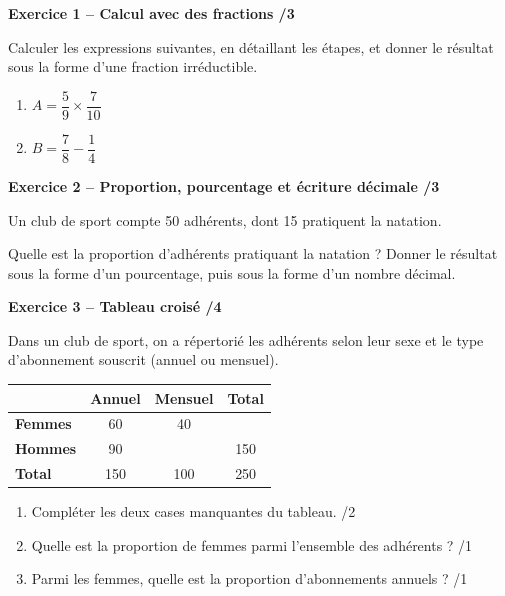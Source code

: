 \documentclass[10pt,a4paper]{article}
\begin{document}
\newpage



\textbf{Exercice 1 -- Calcul avec des fractions \hfill /3}

Calculer les expressions suivantes, en détaillant les étapes, et donner le résultat sous la forme d'une fraction irréductible.

\begin{enumerate}
\item \(A = \dfrac{5}{9}\times\dfrac{7}{10}\)

\vspace{2.5cm}

\item \(B = \dfrac{7}{8}-\dfrac{1}{4}\)

\vspace{2.5cm}
\end{enumerate}

\textbf{Exercice 2 -- Proportion, pourcentage et écriture décimale \hfill /3}

Un club de sport compte 50 adhérents, dont 15 pratiquent la natation.

Quelle est la proportion d'adhérents pratiquant la natation ? Donner le résultat sous la forme d'un pourcentage, puis sous la forme d'un nombre décimal.

\vspace{3cm}

\textbf{Exercice 3 -- Tableau croisé \hfill /4}

Dans un club de sport, on a répertorié les adhérents selon leur sexe et le type d'abonnement souscrit (annuel ou mensuel).

\begin{center}
\renewcommand{\arraystretch}{1.5}
\begin{tabular}{|l|c|c|c|}
\hline
 & \textbf{Annuel} & \textbf{Mensuel} & \textbf{Total} \\
\hline
\textbf{Femmes} & 60 & 40 & \\
\hline
\textbf{Hommes} & 90 & & 150 \\
\hline
\textbf{Total} & 150 & 100 & 250 \\
\hline
\end{tabular}
\end{center}

\begin{enumerate}
\item Compléter les deux cases manquantes du tableau. \hfill /2

\vspace{1.5cm}

\item Quelle est la proportion de femmes parmi l'ensemble des adhérents ? \hfill /1

\vspace{1.5cm}

\item Parmi les femmes, quelle est la proportion d'abonnements annuels ? \hfill /1
\end{enumerate}
\end{document}
